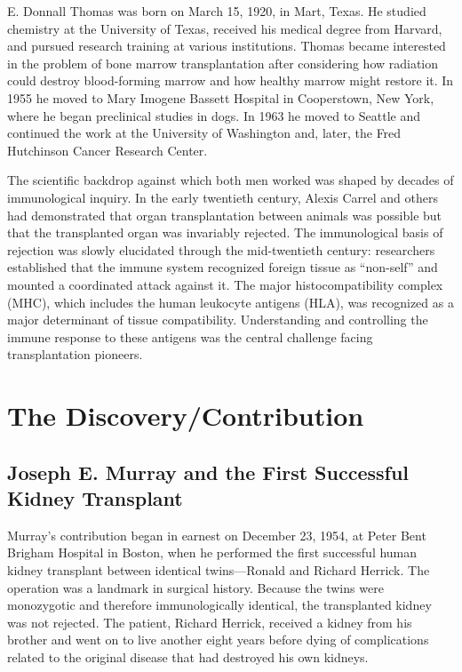 E. Donnall Thomas was born on March 15, 1920, in Mart, Texas. He studied chemistry at the University of Texas, received his medical degree from Harvard, and pursued research training at various institutions. Thomas became interested in the problem of bone marrow transplantation after considering how radiation could destroy blood-forming marrow and how healthy marrow might restore it. In 1955 he moved to Mary Imogene Bassett Hospital in Cooperstown, New York, where he began preclinical studies in dogs. In 1963 he moved to Seattle and continued the work at the University of Washington and, later, the Fred Hutchinson Cancer Research Center.

The scientific backdrop against which both men worked was shaped by decades of immunological inquiry. In the early twentieth century, Alexis Carrel and others had demonstrated that organ transplantation between animals was possible but that the transplanted organ was invariably rejected. The immunological basis of rejection was slowly elucidated through the mid-twentieth century: researchers established that the immune system recognized foreign tissue as ``non-self'' and mounted a coordinated attack against it. The major histocompatibility complex (MHC), which includes the human leukocyte antigens (HLA), was recognized as a major determinant of tissue compatibility. Understanding and controlling the immune response to these antigens was the central challenge facing transplantation pioneers.

\section{The Discovery/Contribution}

\subsection{Joseph E. Murray and the First Successful Kidney Transplant}

Murray's contribution began in earnest on December 23, 1954, at Peter Bent Brigham Hospital in Boston, when he performed the first successful human kidney transplant between identical twins---Ronald and Richard Herrick. The operation was a landmark in surgical history. Because the twins were monozygotic and therefore immunologically identical, the transplanted kidney was not rejected. The patient, Richard Herrick, received a kidney from his brother and went on to live another eight years before dying of complications related to the original disease that had destroyed his own kidneys.

